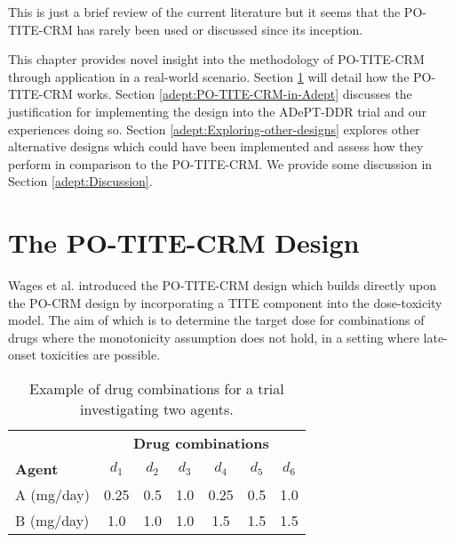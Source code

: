 This is just a brief review of the current literature but it seems that the PO-TITE-CRM has rarely been used or discussed since its inception. 

This chapter provides novel insight into the methodology of PO-TITE-CRM through application in a real-world scenario. Section \ref{adept:PO-TITE-CRM-Design} will detail how the PO-TITE-CRM works. Section \ref{adept:PO-TITE-CRM-in-Adept} discusses the justification for implementing the design into the ADePT-DDR trial and our experiences doing so. Section \ref{adept:Exploring-other-designs} explores other alternative designs which could have been implemented and assess how they perform in comparison to the PO-TITE-CRM. We provide some discussion in Section \ref{adept:Discussion}.

\section{The PO-TITE-CRM Design}
\label{adept:PO-TITE-CRM-Design} 

Wages et al. \cite{wagesUsingTimetoeventContinual2013} introduced the PO-TITE-CRM design which builds directly upon the PO-CRM design by incorporating a TITE component into the dose-toxicity model. The aim of which is to determine the target dose for combinations of drugs where the monotonicity assumption does not hold, in a setting where late-onset toxicities are possible.

\begin{table}[h!]
	\centering
	\caption[Example drug combinations with two agents.]{Example of drug combinations for a trial investigating two agents.}
	\label{tab_adept:ex_drug_combo}
	\begin{tabular}{lcccccc}
		\hline  & \multicolumn{6}{c}{\textbf{Drug combinations}}  \\
		\textbf{Agent} & $d_{1}$ & $d_{2}$ & $d_{3}$ & $d_{4}$ & $d_{5}$ & $d_{6}$ \\ \hline
		A (mg/day) & 0.25 & 0.5 & 1.0 & 0.25 & 0.5 & 1.0         \\
		B (mg/day) & 1.0  & 1.0 & 1.0 & 1.5  & 1.5 & 1.5         \\ \hline
	\end{tabular}
\end{table}

